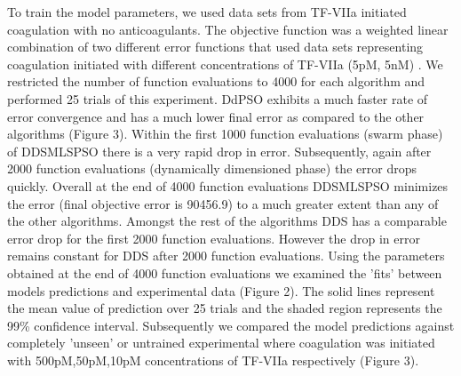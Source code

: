 \documentclass[12pt]{article}
\begin{document}
 To train the model parameters, we used data sets from TF-VIIa initiated coagulation with no anticoagulants. The objective function was a weighted linear combination of two different error functions that used data sets representing coagulation initiated with different concentrations of TF-VIIa (5pM, 5nM) \cite{hockin2002model}. We restricted the number of function evaluations to 4000 for each algorithm and performed 25 trials of this experiment. DdPSO exhibits a much faster rate of error convergence and has a much lower final error as compared to the other algorithms (Figure 3). Within the first 1000 function evaluations (swarm phase) of DDSMLSPSO there is a very rapid drop in error. Subsequently, again after 2000 function evaluations (dynamically dimensioned phase) the error drops quickly. Overall at the end of 4000 function evaluations DDSMLSPSO minimizes the error (final objective error is 90456.9) to a much greater extent than any of the other algorithms. Amongst the rest of the algorithms DDS has a comparable error drop for the first 2000 function evaluations. However the drop in error remains constant for DDS after 2000 function evaluations. Using the parameters obtained at the end of 4000 function evaluations we examined the 'fits' between models predictions and experimental data (Figure 2). The solid lines represent the mean value of prediction over 25 trials and the shaded region represents the 99\% confidence interval. Subsequently we compared the model predictions against completely 'unseen' or untrained experimental where coagulation was initiated with 500pM,50pM,10pM concentrations of TF-VIIa respectively (Figure 3).

\clearpage
\end{document}
